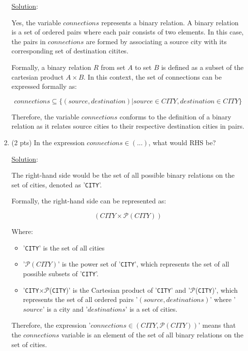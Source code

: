 \documentclass[12pt]{article}
\begin{document}
\begin{spacing}{1.5}
\begin{enumerate}
		      \noindent \underline{Solution}:
		      
		      Yes, the variable $connections$ represents a binary relation. A binary relation is a set of ordered pairs where each pair consists of two elements. In this case, the pairs in $connections$ are formed by associating a source city with its corresponding set of destination citites.
		      		      
		      Formally, a binary relation $R$ from set $A$ to set $B$ is defined as a subset of the cartesian product $A\times B$. In this context, the set of connections can be expressed formally as:
		      		      
		      $$connections \subseteq \{(source, destination) | source \in CITY, destination \in CITY\}$$
		      		      
		      Therefore, the variable $connections$ conforms to the definition of a binary relation as it relates source cities to their respective destination cities in pairs.
		      		          
		\item (2 pts) In the expression $connections \in (...)$, what would RHS be?
		      
		      \noindent \underline{Solution}:
		              
		      The right-hand side would be the set of all possible binary relations on the set of cities, denoted as '\texttt{CITY}'.
		      		      
		      Formally, the right-hand side can be represented as:
		      		      
		      $$(CITY \times \mathcal{P}(CITY))$$
		      		      
		      Where:
		      \begin{itemize}
		      	\item '\texttt{CITY}' is the set of all cities
		      	\item '$\mathcal{P}(CITY)$' is the power set of '\texttt{CITY}', which represents the set of all possible subsets of '\texttt{CITY}'.
		      	\item '\texttt{CITY}$\times \mathcal{P}$(\texttt{CITY})' is the Cartesian product of '\texttt{CITY}' and '$\mathcal{P}$(\texttt{CITY})', which represents the set of all ordered pairs '$(source, destinations)$' where '$source$' is a city and '$destinations$' is a set of cities.
		      \end{itemize}
		      		      
		      Therefore, the expression '$connections \in (CITY, \mathcal{P}(CITY))$' means that the $connections$ variable is an element of the set of all binary relations on the set of cities.
		      		      

\end{enumerate}
\end{spacing}
\end{document}

